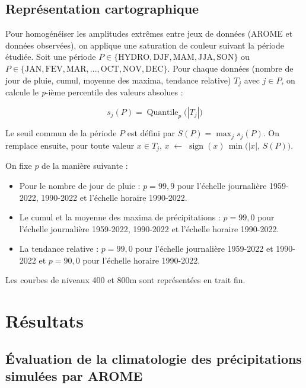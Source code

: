\documentclass[
  article,
  nofooter,
  noheadings]{jss}
\providecommand{\tightlist}{%
  \setlength{\itemsep}{0pt}\setlength{\parskip}{0pt}}
\begin{document}
\subsection{Représentation
cartographique}\label{repruxe9sentation-cartographique}

Pour homogénéiser les amplitudes extrêmes entre jeux de données (AROME
et données observées), on applique une saturation de couleur suivant la
période étudiée. Soit une période
\(P \in \{\text{HYDRO}, \text{DJF},\text{MAM},\text{JJA},\text{SON}\}\)
ou
\(P \in \{\text{JAN},\text{FEV},\text{MAR},\text{...},\text{OCT},\text{NOV},\text{DEC}\}\).
Pour chaque données (nombre de jour de pluie, cumul, moyenne des maxima,
tendance relative) \(T_j\) avec \(j \in P\), on calcule le \emph{p}-ième
percentile des valeurs absolues :

\[
s_j(P)=\operatorname{Quantile}_{p}\big(|T_j|\big)
\]

Le seuil commun de la période \(P\) est défini par
\(S(P)=\max_j s_j(P)\). On remplace ensuite, pour toute valeur
\(x\in T_j\),
\(x \;\leftarrow\; \operatorname{sign}(x)\,\min\big(|x|,\,S(P)\big)\).

On fixe \(p\) de la manière suivante :

\begin{itemize}
\tightlist
\item
  Pour le nombre de jour de pluie : \(p = 99,9\) pour l'échelle
  journalière 1959-2022, 1990-2022 et l'échelle horaire 1990-2022.
\item
  Le cumul et la moyenne des maxima de précipitations : \(p = 99,0\)
  pour l'échelle journalière 1959-2022, 1990-2022 et l'échelle horaire
  1990-2022.
\item
  La tendance relative : \(p = 99,0\) pour l'échelle journalière
  1959-2022 et 1990-2022 et \(p = 90,0\) pour l'échelle horaire
  1990-2022.
\end{itemize}

Les courbes de niveaux 400 et 800m sont représentées en trait fin.

\section{Résultats}\label{ruxe9sultats}

\subsection{Évaluation de la climatologie des précipitations simulées
par
AROME}\label{uxe9valuation-de-la-climatologie-des-pruxe9cipitations-simuluxe9es-par-arome}
\end{document}
